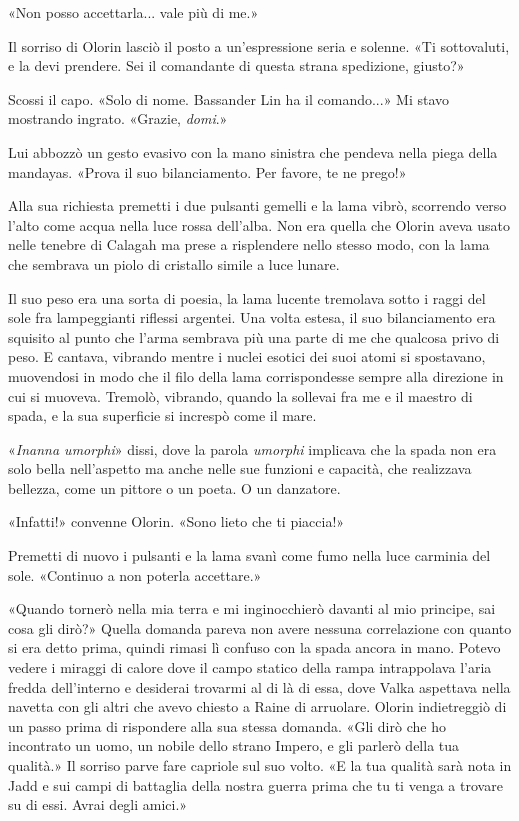 «Non posso accettarla... vale più di me.»

Il sorriso di Olorin lasciò il posto a un'espressione seria e solenne.
«Ti sottovaluti, e la devi prendere. Sei il comandante di questa strana
spedizione, giusto?»

Scossi il capo. «Solo di nome. Bassander Lin ha il comando...» Mi stavo
mostrando ingrato. «Grazie, \emph{domi}.»

Lui abbozzò un gesto evasivo con la mano sinistra che pendeva nella
piega della mandayas. «Prova il suo bilanciamento. Per favore, te ne
prego!»

Alla sua richiesta premetti i due pulsanti gemelli e la lama vibrò,
scorrendo verso l'alto come acqua nella luce rossa dell'alba. Non era
quella che Olorin aveva usato nelle tenebre di Calagah ma prese a
risplendere nello stesso modo, con la lama che sembrava un piolo di
cristallo simile a luce lunare.

Il suo peso era una sorta di poesia, la lama lucente tremolava sotto i
raggi del sole fra lampeggianti riflessi argentei. Una volta estesa, il
suo bilanciamento era squisito al punto che l'arma sembrava più una
parte di me che qualcosa privo di peso. E cantava, vibrando mentre i
nuclei esotici dei suoi atomi si spostavano, muovendosi in modo che il
filo della lama corrispondesse sempre alla direzione in cui si muoveva.
Tremolò, vibrando, quando la sollevai fra me e il maestro di spada, e la
sua superficie si increspò come il mare.

«\emph{Inanna umorphi}» dissi, dove la parola \emph{umorphi} implicava
che la spada non era solo bella nell'aspetto ma anche nelle sue funzioni
e capacità, che realizzava bellezza, come un pittore o un poeta. O un
danzatore.

«Infatti!» convenne Olorin. «Sono lieto che ti piaccia!»

Premetti di nuovo i pulsanti e la lama svanì come fumo nella luce
carminia del sole. «Continuo a non poterla accettare.»

«Quando tornerò nella mia terra e mi inginocchierò davanti al mio
principe, sai cosa gli dirò?» Quella domanda pareva non avere nessuna
correlazione con quanto si era detto prima, quindi rimasi lì confuso con
la spada ancora in mano. Potevo vedere i miraggi di calore dove il campo
statico della rampa intrappolava l'aria fredda dell'interno e desiderai
trovarmi al di là di essa, dove Valka aspettava nella navetta con gli
altri che avevo chiesto a Raine di arruolare. Olorin indietreggiò di un
passo prima di rispondere alla sua stessa domanda. «Gli dirò che ho
incontrato un uomo, un nobile dello strano Impero, e gli parlerò della
tua qualità.» Il sorriso parve fare capriole sul suo volto. «E la tua
qualità sarà nota in Jadd e sui campi di battaglia della nostra guerra
prima che tu ti venga a trovare su di essi. Avrai degli amici.»

